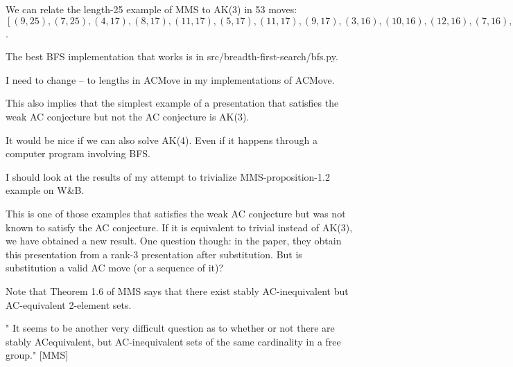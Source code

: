 We can relate the length-25 example of MMS to AK(3) in 53 moves: $[(9, 25), (7, 25), (4, 17), (8, 17), (11, 17), (5, 17), (11, 17), (9, 17), (3, 16), (10, 16), (12, 16), (7, 16), (7, 16), (9, 16), (11, 16), (5, 16), (3, 15), (5, 15), (4, 19), (3, 14), (12, 14), (5, 14), (7, 16), (7, 18), (1, 19), (9, 19), (11, 19), (8, 19), (3, 18), (5, 18), (10, 18), (2, 15), (6, 15), (12, 15), (9, 15), (7, 15), (5, 15), (11, 15), (10, 15), (3, 15), (8, 15), (11, 15), (9, 15), (2, 16), (10, 16), (12, 16), (5, 16), (7, 16), (9, 16), (11, 16), (1, 13), (9, 13), (8, 13)]$.

The best BFS implementation that works is in src/breadth-first-search/bfs.py.

I need to change -- to lengths in ACMove in my implementations of ACMove.

This also implies that the simplest example of a presentation that satisfies the weak AC conjecture but not the AC conjecture is AK(3).

It would be nice if we can also solve AK(4).
Even if it happens through a computer program involving BFS.

I should look at the results of my attempt to trivialize MMS-proposition-1.2 example on W\&B.

This is one of those examples that satisfies the weak AC conjecture but was not known to satisfy the AC conjecture.
If it is equivalent to trivial instead of AK(3), we have obtained a new result.
One question though: in the paper, they obtain this presentation from a rank-3 presentation after substitution.
But is substitution a valid AC move (or a sequence of it)?

Note that Theorem 1.6 of MMS says that there exist stably AC-inequivalent but AC-equivalent 2-element sets.

" It seems to
be another very difficult question as to whether or not there are stably ACequivalent, but AC-inequivalent sets of the same cardinality in a free group." [MMS]

